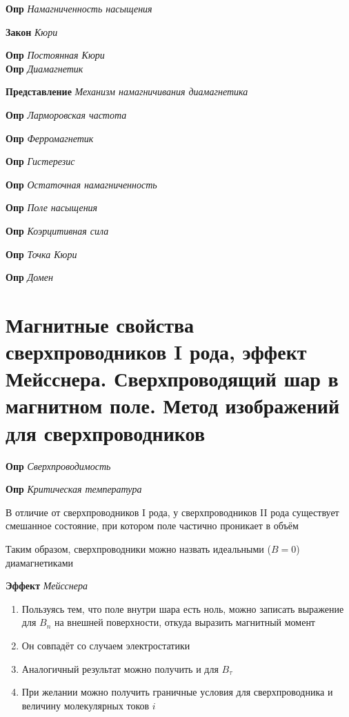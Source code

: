 \documentclass[a4paper, 14pt]{article}
\begin{document}
    \textbf{Опр} \textit{Намагниченность насыщения}
    
    \textbf{Закон} \textit{Кюри}
    
    \textbf{Опр} \textit{Постоянная Кюри} \\
    
    \textbf{Опр} \textit{Диамагнетик}
    
    \textbf{Представление} \textit{Механизм намагничивания диамагнетика}
    
    \textbf{Опр} \textit{Ларморовская частота}
    
    \textbf{Опр} \textit{Ферромагнетик}
    
    \textbf{Опр} \textit{Гистерезис}
    
    \textbf{Опр} \textit{Остаточная намагниченность}
    
    \textbf{Опр} \textit{Поле насыщения}
    
    \textbf{Опр} \textit{Коэрцитивная сила}
    
    \textbf{Опр} \textit{Точка Кюри}
    
    \textbf{Опр} \textit{Домен}
    
    \section{Магнитные свойства сверхпроводников I рода, эффект Мейсснера.
    Сверхпроводящий шар в магнитном поле.
    Метод изображений для сверхпроводников}
    
    \textbf{Опр} \textit{Сверхпроводимость}
    
    \textbf{Опр} \textit{Критическая температура}
    
    В отличие от сверхпроводников I рода, у сверхпроводников II рода существует смешанное состояние, при котором поле
    частично проникает в объём
    
    Таким образом, сверхпроводники можно назвать идеальными ($B = 0$) диамагнетиками
    
    \textbf{Эффект} \textit{Мейсснера}
    
    \begin{enumerate}
        \item Пользуясь тем, что поле внутри шара есть ноль, можно записать выражение для $B_n$ на внешней
        поверхности, откуда выразить магнитный момент
        \item Он совпадёт со случаем электростатики
        \item Аналогичный результат можно получить и для $B_\tau$
        \item При желании можно получить граничные условия для сверхпроводника и величину молекулярных токов $i$
    \end{enumerate}
    
\end{document}
